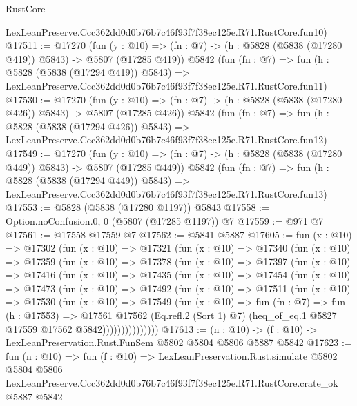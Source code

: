 \begin{lexlean}{RustCore}
\begin{coremodule}
    LexLeanPreserve.Ccc362dd0d0b76b7c46f93f7f38ec125e.R71.RustCore.fun10)
@17511 := @17270
    (fun (y : @10) => (fn : @7) -> (h : @5828 (@5838 (@17280 @419)) @5843) -> @5807 (@17285 @419))
    @5842
    (fun (fn : @7) =>
    fun (h : @5828 (@5838 (@17294 @419)) @5843) =>
    LexLeanPreserve.Ccc362dd0d0b76b7c46f93f7f38ec125e.R71.RustCore.fun11)
@17530 := @17270
    (fun (y : @10) => (fn : @7) -> (h : @5828 (@5838 (@17280 @426)) @5843) -> @5807 (@17285 @426))
    @5842
    (fun (fn : @7) =>
    fun (h : @5828 (@5838 (@17294 @426)) @5843) =>
    LexLeanPreserve.Ccc362dd0d0b76b7c46f93f7f38ec125e.R71.RustCore.fun12)
@17549 := @17270
    (fun (y : @10) => (fn : @7) -> (h : @5828 (@5838 (@17280 @449)) @5843) -> @5807 (@17285 @449))
    @5842
    (fun (fn : @7) =>
    fun (h : @5828 (@5838 (@17294 @449)) @5843) =>
    LexLeanPreserve.Ccc362dd0d0b76b7c46f93f7f38ec125e.R71.RustCore.fun13)
@17553 := @5828 (@5838 (@17280 @1197)) @5843
@17558 := Option.noConfusion.{0, 0} (@5807 (@17285 @1197)) @7
@17559 := @971 @7
@17561 := @17558 @17559 @7
@17562 := @5841 @5887
@17605 := fun (x : @10) =>
  @17302
    (fun (x : @10) =>
    @17321
      (fun (x : @10) =>
      @17340
        (fun (x : @10) =>
        @17359
          (fun (x : @10) =>
          @17378
            (fun (x : @10) =>
            @17397
              (fun (x : @10) =>
              @17416
                (fun (x : @10) =>
                @17435
                  (fun (x : @10) =>
                  @17454
                    (fun (x : @10) =>
                    @17473
                      (fun (x : @10) =>
                      @17492
                        (fun (x : @10) =>
                        @17511
                          (fun (x : @10) =>
                          @17530
                            (fun (x : @10) =>
                            @17549
                              (fun (x : @10) =>
                              fun (fn : @7) =>
                              fun (h : @17553) =>
                              @17561
                                @17562
                                (Eq.refl.{2} (Sort 1) @7)
                                (heq_of_eq.{1} @5827 @17559 @17562 @5842)))))))))))))))
@17613 := (n : @10) -> (f : @10) -> LexLeanPreservation.Rust.FunSem @5802 @5804 @5806 @5887 @5842
@17623 := fun (n : @10) =>
  fun (f : @10) =>
  LexLeanPreservation.Rust.simulate
    @5802
    @5804
    @5806
    LexLeanPreserve.Ccc362dd0d0b76b7c46f93f7f38ec125e.R71.RustCore.crate_ok
    @5887
    @5842
\end{coremodule}
\end{lexlean}
